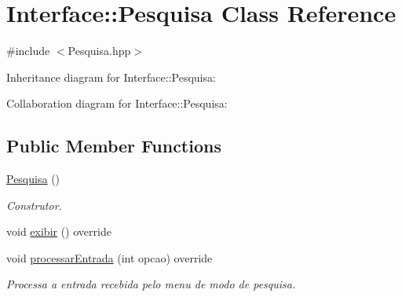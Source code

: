\hypertarget{class_interface_1_1_pesquisa}{}\section{Interface\+:\+:Pesquisa Class Reference}
\label{class_interface_1_1_pesquisa}


{\ttfamily \#include $<$Pesquisa.\+hpp$>$}



Inheritance diagram for Interface\+:\+:Pesquisa\+:


Collaboration diagram for Interface\+:\+:Pesquisa\+:
\subsection*{Public Member Functions}
\begin{DoxyCompactItemize}
\item 
\hyperlink{class_interface_1_1_pesquisa_a7662b8d1f935e7edd9a13f6f0b05c329}{Pesquisa} ()
\begin{DoxyCompactList}\small\item\em Construtor. \end{DoxyCompactList}\item 
void \hyperlink{class_interface_1_1_pesquisa_a4d89df37dbf36d20f07c2dd00a6b97f3}{exibir} () override
\item 
void \hyperlink{class_interface_1_1_pesquisa_aad98a86ce0fd0ef1bcd1d80bd24f167f}{processar\+Entrada} (int opcao) override
\begin{DoxyCompactList}\small\item\em Processa a entrada recebida pelo menu de modo de pesquisa. \end{DoxyCompactList}\end{DoxyCompactItemize}
